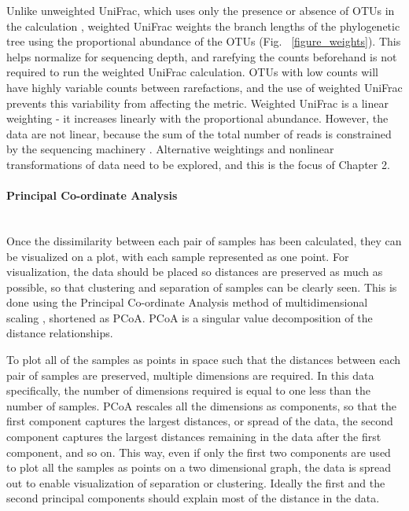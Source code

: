 Unlike unweighted UniFrac, which uses only the presence or absence of OTUs in the calculation \cite{lozupone2005unifrac}, weighted UniFrac weights the branch lengths of the phylogenetic tree using the proportional abundance of the OTUs \cite{lozupone2007quantitative} (Fig. ~\ref{figure_weights}). This helps normalize for sequencing depth, and rarefying the counts beforehand is not required to run the weighted UniFrac calculation. OTUs with low counts will have highly variable counts between rarefactions, and the use of weighted UniFrac prevents this variability from affecting the metric. Weighted UniFrac is a linear weighting - it increases linearly with the proportional abundance. However, the data are not linear, because the sum of the total number of reads is constrained by the sequencing machinery \cite{friedman2012inferring}. Alternative weightings and nonlinear transformations of data need to be explored, and this is the focus of Chapter 2.

\paragraph{Principal Co-ordinate Analysis}\mbox{}\\
Once the dissimilarity between each pair of samples has been calculated, they can be visualized on a plot, with each sample represented as one point. For visualization, the data should be placed so distances are preserved as much as possible, so that clustering and separation of samples can be clearly seen. This is done using the Principal Co-ordinate Analysis method of multidimensional scaling \cite{dollhopf2001interpreting}, shortened as PCoA. PCoA is a singular value decomposition of the distance relationships.

To plot all of the samples as points in space such that the distances between each pair of samples are preserved, multiple dimensions are required. In this data specifically, the number of dimensions required is equal to one less than the number of samples. PCoA rescales all the dimensions as components, so that the first component captures the largest distances, or spread of the data, the second component captures the largest distances remaining in the data after the first component, and so on. This way, even if only the first two components are used to plot all the samples as points on a two dimensional graph, the data is spread out to enable visualization of separation or clustering. Ideally the first and the second principal components should explain most of the distance in the data.


